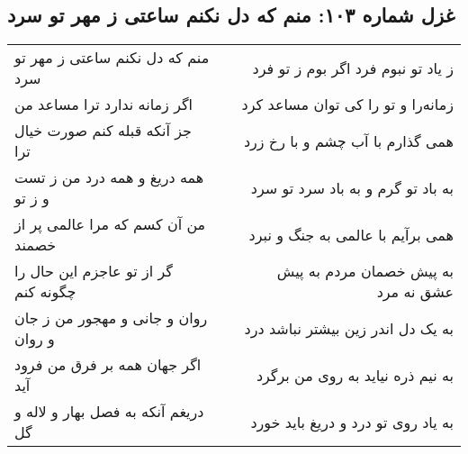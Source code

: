 \begin{center}
\section*{غزل شماره ۱۰۳: منم که دل نکنم ساعتی ز مهر تو سرد}
\label{sec:103}
\begin{longtable}{l p{0.5cm} r}
منم که دل نکنم ساعتی ز مهر تو سرد
&&
ز یاد تو نبوم فرد اگر بوم ز تو فرد
\\
اگر زمانه ندارد ترا مساعد من
&&
زمانه‌را و تو را کی توان مساعد کرد
\\
جز آنکه قبله کنم صورت خیال ترا
&&
همی گذارم با آب چشم و با رخ زرد
\\
همه دریغ و همه درد من ز تست و ز تو
&&
به باد تو گرم و به باد سرد تو سرد
\\
من آن کسم که مرا عالمی پر از خصمند
&&
همی برآیم با عالمی به جنگ و نبرد
\\
گر از تو عاجزم این حال را چگونه کنم
&&
به پیش خصمان مردم به پیش عشق نه مرد
\\
روان و جانی و مهجور من ز جان و روان
&&
به یک دل اندر زین بیشتر نباشد درد
\\
اگر جهان همه بر فرق من فرود آید
&&
به نیم ذره نیاید به روی من برگرد
\\
دریغم آنکه به فصل بهار و لاله و گل
&&
به یاد روی تو درد و دریغ باید خورد
\\
\end{longtable}
\end{center}
